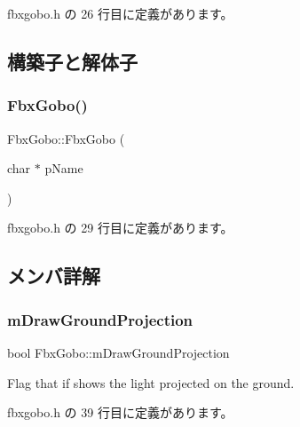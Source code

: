  fbxgobo.\+h の 26 行目に定義があります。



\subsection{構築子と解体子}
\mbox{\label{class_fbx_gobo_a2f7f2ac035e00dcc2b89b70b3d317b01}} 
\subsubsection{\texorpdfstring{Fbx\+Gobo()}{FbxGobo()}}
{\footnotesize\ttfamily Fbx\+Gobo\+::\+Fbx\+Gobo (\begin{DoxyParamCaption}\item[{char $\ast$}]{p\+Name }\end{DoxyParamCaption})\hspace{0.3cm}{\ttfamily [inline]}}



 fbxgobo.\+h の 29 行目に定義があります。



\subsection{メンバ詳解}
\mbox{\label{class_fbx_gobo_a1c8766e60f641764794d1d444bbf3a7b}} 
\subsubsection{\texorpdfstring{m\+Draw\+Ground\+Projection}{mDrawGroundProjection}}
{\footnotesize\ttfamily bool Fbx\+Gobo\+::m\+Draw\+Ground\+Projection}



Flag that if shows the light projected on the ground. 



 fbxgobo.\+h の 39 行目に定義があります。

\mbox{\label{class_fbx_gobo_a5b092ea9f3fd2f5c589135e8fe4f5ef6}} 
